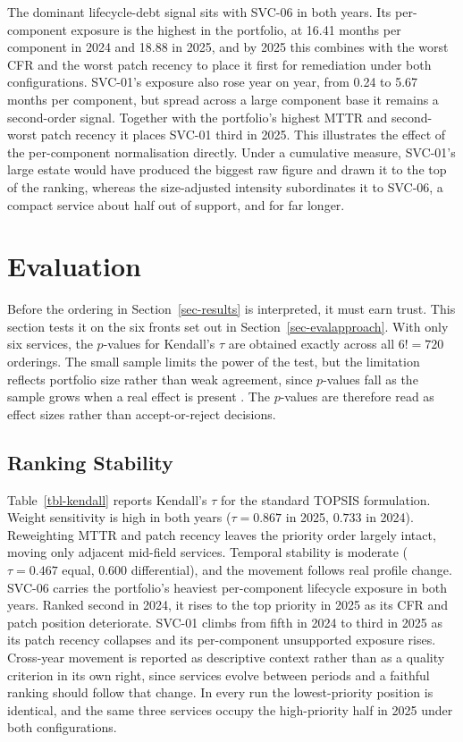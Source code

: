 \documentclass[
  authoryear,
  preprint]{elsarticle}
\begin{document}
The dominant lifecycle-debt signal sits with SVC-06 in both years. Its
per-component exposure is the highest in the portfolio, at 16.41 months
per component in 2024 and 18.88 in 2025, and by 2025 this combines with
the worst CFR and the worst patch recency to place it first for
remediation under both configurations. SVC-01's exposure also rose year
on year, from 0.24 to 5.67 months per component, but spread across a
large component base it remains a second-order signal. Together with the
portfolio's highest MTTR and second-worst patch recency it places SVC-01
third in 2025. This illustrates the effect of the per-component
normalisation directly. Under a cumulative measure, SVC-01's large
estate would have produced the biggest raw figure and drawn it to the
top of the ranking, whereas the size-adjusted intensity subordinates it
to SVC-06, a compact service about half out of support, and for far
longer.

\section{Evaluation}\label{sec-evaluation}

Before the ordering in Section~\ref{sec-results} is interpreted, it must
earn trust. This section tests it on the six fronts set out in
Section~\ref{sec-evalapproach}. With only six services, the \(p\)-values
for Kendall's \(\tau\) are obtained exactly across all \(6! = 720\)
orderings. The small sample limits the power of the test, but the
limitation reflects portfolio size rather than weak agreement, since
\(p\)-values fall as the sample grows when a real effect is present
\citep{chenRolesChallengesMerits2023}. The \(p\)-values are therefore
read as effect sizes rather than accept-or-reject decisions.

\subsection{Ranking Stability}\label{sec-stability}

Table~\ref{tbl-kendall} reports Kendall's \(\tau\) for the standard
TOPSIS formulation. Weight sensitivity is high in both years
(\(\tau = 0.867\) in 2025, \(0.733\) in 2024). Reweighting MTTR and
patch recency leaves the priority order largely intact, moving only
adjacent mid-field services. Temporal stability is moderate
(\(\tau = 0.467\) equal, \(0.600\) differential), and the movement
follows real profile change. SVC-06 carries the portfolio's heaviest
per-component lifecycle exposure in both years. Ranked second in 2024,
it rises to the top priority in 2025 as its CFR and patch position
deteriorate. SVC-01 climbs from fifth in 2024 to third in 2025 as its
patch recency collapses and its per-component unsupported exposure
rises. Cross-year movement is reported as descriptive context rather
than as a quality criterion in its own right, since services evolve
between periods and a faithful ranking should follow that change. In
every run the lowest-priority position is identical, and the same three
services occupy the high-priority half in 2025 under both
configurations.
\end{document}
